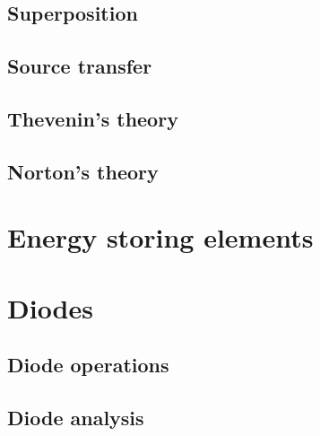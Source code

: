 \documentclass[a4paper]{book}
\begin{document}
  \subsection{Superposition}
  \subsection{Source transfer}
  \subsection{Thevenin's theory}
  \subsection{Norton's theory}
\section{Energy storing elements}
\section{Diodes}
  \subsection{Diode operations}
  \subsection{Diode analysis}
\end{document}
